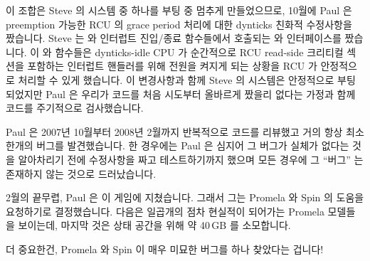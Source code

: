 \fi

이 조합은 Steve 의 시스템 중 하나를 부팅 중 멈추게 만들었으므로, 10월에 Paul 은
preemption 가능한 RCU 의 grace period 처리에 대한 dynticks 친화적 수정사항을
짰습니다.
Steve 는  와  인터럽트 진입/종료 함수들에서
호출되는  와  인터페이스를 짰습니다.
이  와  함수들은 dynticks-idle CPU 가
순간적으로 RCU read-side 크리티컬 섹션을 포함하는 인터럽트 핸들러를 위해 전원을
켜지게 되는 상황을 RCU 가 안정적으로 처리할 수 있게 했습니다.
이 변경사항과 함께 Steve 의 시스템은 안정적으로 부팅되었지만 Paul 은 우리가
코드를 처음 시도부터 올바르게 짰을리 없다는 가정과 함께 코드를 주기적으로
검사했습니다.

Paul 은 2007년 10월부터 2008년 2월까지 반복적으로 코드를 리뷰했고 거의 항상
최소 한개의 버그를 발견했습니다.
한 경우에는 Paul 은 심지어 그 버그가 실체가 없다는 것을 알아차리기 전에
수정사항을 짜고 테스트하기까지 했으며 모든 경우에 그 ``버그'' 는 존재하지 않는
것으로 드러났습니다.

\iffalse

This combination caused one of Steve's systems to hang on boot, so in
October, Paul coded up a dynticks-friendly modification to preemptible RCU's
grace-period processing.
Steve coded up \co{rcu_irq_enter()} and \co{rcu_irq_exit()}
interfaces called from the
\co{irq_enter()} and \co{irq_exit()} interrupt
entry/exit functions.
These \co{rcu_irq_enter()} and \co{rcu_irq_exit()}
functions are needed to allow RCU to reliably handle situations where
a dynticks-idle CPU is momentarily powered up for an interrupt
handler containing RCU read-side critical sections.
With these changes in place, Steve's system booted reliably,
but Paul continued inspecting the code periodically on the assumption
that we could not possibly have gotten the code right on the first try.

Paul reviewed the code repeatedly from October 2007 to February 2008,
and almost always found at least one bug.
In one case, Paul even coded and tested a fix before realizing that the
bug was illusory, and in fact in all cases, the ``bug'' turned out to be
illusory.

\fi

2월의 끝무렵, Paul 은 이 게임에 지쳤습니다.
그래서 그는 Promela 와 Spin 의 도움을 요청하기로 결정했습니다.
다음은 일곱개의 점차 현실적이 되어가는 Promela 모델들을 보이는데, 마지막 것은
상태 공간을 위해 약 40\,GB 를 소모합니다.

더 중요한건, Promela 와 Spin 이 매우 미묘한 버그를 하나 찾았다는 겁니다!

